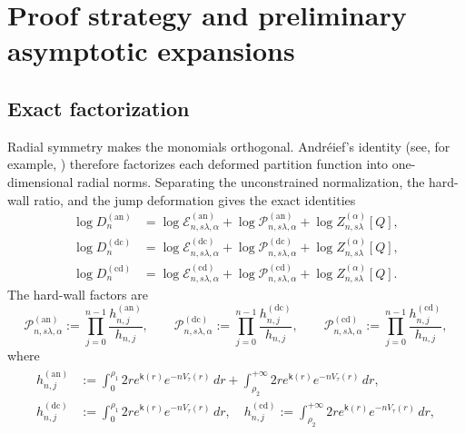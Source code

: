 \documentclass[a4paper]{article}
\numberwithin{equation}{section}
\begin{document}
\section{Proof strategy and preliminary asymptotic expansions}
\label{section:preliminary}
\subsection{Exact factorization}
Radial symmetry makes the monomials orthogonal.  Andr\'{e}ief's identity
(see, for example, \cite{C2021}) therefore factorizes each deformed
partition function into one-dimensional radial norms.  Separating the
unconstrained normalization, the hard-wall ratio, and the jump deformation
gives the exact identities
\begin{align}
\label{def of log Dnan Dndc Dncd}
\log D_{n}^{(\mathrm{an})}
&=\log\mathcal{E}_{n,s\lambda,\alpha}^{(\mathrm{an})}
+\log\mathcal{P}_{n,s\lambda,\alpha}^{(\mathrm{an})}
+\log Z_{n,s\lambda}^{(\alpha)}[Q],
\\
\log D_{n}^{(\mathrm{dc})}
&=\log\mathcal{E}_{n,s\lambda,\alpha}^{(\mathrm{dc})}
+\log\mathcal{P}_{n,s\lambda,\alpha}^{(\mathrm{dc})}
+\log Z_{n,s\lambda}^{(\alpha)}[Q],
\\
\log D_{n}^{(\mathrm{cd})}
&=\log\mathcal{E}_{n,s\lambda,\alpha}^{(\mathrm{cd})}
+\log\mathcal{P}_{n,s\lambda,\alpha}^{(\mathrm{cd})}
+\log Z_{n,s\lambda}^{(\alpha)}[Q].
\end{align}
The hard-wall factors are
\begin{equation}
\label{def of mathcalPn an dc cd}
\mathcal{P}_{n,s\lambda,\alpha}^{(\mathrm{an})}
:=\prod_{j=0}^{n-1}\frac{h_{n,j}^{(\mathrm{an})}}{h_{n,j}}, 
\qquad
\mathcal{P}_{n,s\lambda,\alpha}^{(\mathrm{dc})}
:=\prod_{j=0}^{n-1}\frac{h_{n,j}^{(\mathrm{dc})}}{h_{n,j}}, 
\qquad
\mathcal{P}_{n,s\lambda,\alpha}^{(\mathrm{cd})}
:=\prod_{j=0}^{n-1}\frac{h_{n,j}^{(\mathrm{cd})}}{h_{n,j}}, 
\end{equation}
where 
\begin{align}
\begin{split}
\label{def of hjnU}
h_{n,j}^{(\mathrm{an})}&:=
\int_{0}^{\rho_1}
2re^{\mathsf{k}(r)} e^{-nV_{\tau}(r)}\,dr
+
\int_{\rho_2}^{+\infty}
2re^{\mathsf{k}(r)} e^{-nV_{\tau}(r)}\,dr,
\\
h_{n,j}^{(\mathrm{dc})}&:=
\int_{0}^{\rho_1}2re^{\mathsf{k}(r)} e^{-nV_{\tau}(r)}\,dr,\quad
h_{n,j}^{(\mathrm{cd})}:=
\int_{\rho_2}^{+\infty}2re^{\mathsf{k}(r)} e^{-nV_{\tau}(r)}\,dr,
\end{split}
\end{align}
\end{document}
